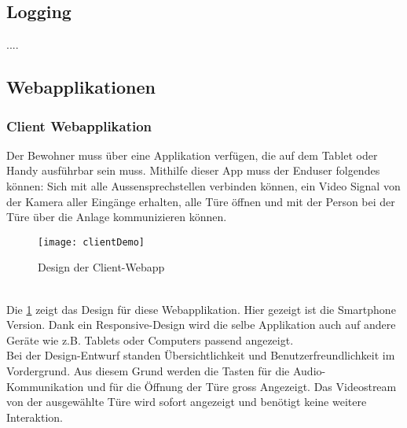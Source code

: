 \subsection{Logging}
\label{kap:logs}
....


\subsection{Webapplikationen}
\label{kap:webapp}


\subsubsection{Client Webapplikation}
Der Bewohner muss über eine Applikation verfügen, die auf dem Tablet oder Handy ausführbar sein muss. Mithilfe dieser App muss der Enduser folgendes können: Sich mit alle Aussensprechstellen verbinden können, ein Video Signal von der Kamera aller Eingänge erhalten, alle Türe öffnen und mit der Person bei der Türe über die Anlage kommunizieren können.
\\
\begin{figure}[htb!]
	\begin{center}
		\texttt{[image: clientDemo]}
		\caption[Design der Client-Webapp]{Design der Client-Webapp}
		\label{fig:clientDemo}
	\end{center}
\end{figure}
\\
Die \cref{fig:clientDemo} zeigt das Design für diese Webapplikation. Hier gezeigt ist die Smartphone Version. Dank ein Responsive-Design wird die selbe Applikation auch auf andere Geräte wie z.B. Tablets oder Computers passend angezeigt.
\\ 
Bei der Design-Entwurf standen Übersichtlichkeit und Benutzerfreundlichkeit im Vordergrund. Aus diesem Grund werden die Tasten für die Audio-Kommunikation und für die Öffnung der Türe gross Angezeigt. Das Videostream von der ausgewählte Türe wird sofort angezeigt und benötigt keine weitere Interaktion. 


